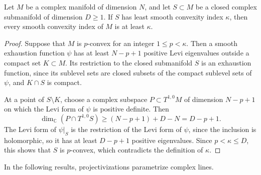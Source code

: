 \begin{lemma}\label{lem:closed-submanifold-complement-index-bound}
Let $M$ be a complex manifold of dimension $N$, and let $S\subset M$ be a closed complex submanifold of dimension $D\geq1$. If $S$ has least smooth convexity index $\kappa$, then every smooth convexity index of $M$ is at least $\kappa$.
\end{lemma}
\begin{proof}
Suppose that $M$ is $p$-convex for an integer $1\leq p<\kappa$. Then a smooth exhaustion function $\psi$ has at least $N-p+1$ positive Levi eigenvalues outside a compact set $K\subset M$. Its restriction to the closed submanifold $S$ is an exhaustion function, since its sublevel sets are closed subsets of the compact sublevel sets of $\psi$, and $K\cap S$ is compact.

At a point of $S\setminus K$, choose a complex subspace $P\subset T^{1,0}M$ of dimension $N-p+1$ on which the Levi form of $\psi$ is positive definite. Then
\[
 \dim_{\mathbb C}(P\cap T^{1,0}S)\geq (N-p+1)+D-N=D-p+1.
\]
The Levi form of $\psi|_S$ is the restriction of the Levi form of $\psi$, since the inclusion is holomorphic, so it has at least $D-p+1$ positive eigenvalues. Since $p<\kappa\leq D$, this shows that $S$ is $p$-convex, which contradicts the definition of $\kappa$.
\end{proof}

In the following results, projectivizations parametrize complex lines.

